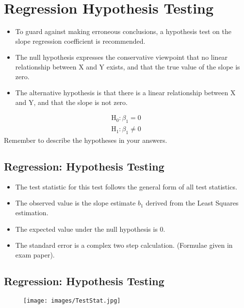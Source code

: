 \documentclass[]{report}
\begin{document}
	
	\section{Regression Hypothesis Testing}
	\begin{itemize}
		\item To guard against making erroneous conclusions, a hypothesis test on the slope regression coefficient is
		recommended.
		\item The null hypothesis expresses the conservative viewpoint that no linear relationship between X and Y exists, and that the true value of the slope is zero.
		\item The alternative hypothesis is that there is a linear relationship between X and Y, and that the slope is not zero.
	\end{itemize}
	\begin{eqnarray}
	\mbox{H}_{0} : \beta_1 = 0 \\
	\mbox{H}_{1} : \beta_1 \neq 0 
	\end{eqnarray}
	Remember to describe the hypotheses in your answers.
	
	
	
	\subsection{Regression: Hypothesis Testing}
	\begin{itemize}
		\item The test statistic for this test follows the general form of all test statistics.
		\item The observed value is the slope estimate $b_1$ derived from the Least Squares estimation.
		\item The expected value under the null hypothesis is 0.
		\item The standard error is a complex two step calculation. (Formulae given in exam paper).
	\end{itemize}
	
	
	\subsection{Regression: Hypothesis Testing}
	\begin{figure}[h!]
		\texttt{[image: images/TestStat.jpg]}\\
	\end{figure}
	
\end{document}
